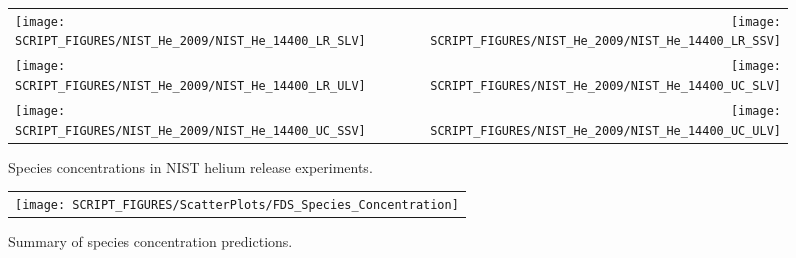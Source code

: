 \begin{figure}[p]
\begin{tabular*}{\textwidth}{l@{\extracolsep{\fill}}r}
\texttt{[image: SCRIPT\_FIGURES/NIST\_He\_2009/NIST\_He\_14400\_LR\_SLV]} &
\texttt{[image: SCRIPT\_FIGURES/NIST\_He\_2009/NIST\_He\_14400\_LR\_SSV]} \\
\texttt{[image: SCRIPT\_FIGURES/NIST\_He\_2009/NIST\_He\_14400\_LR\_ULV]} &
\texttt{[image: SCRIPT\_FIGURES/NIST\_He\_2009/NIST\_He\_14400\_UC\_SLV]} \\
\texttt{[image: SCRIPT\_FIGURES/NIST\_He\_2009/NIST\_He\_14400\_UC\_SSV]} &
\texttt{[image: SCRIPT\_FIGURES/NIST\_He\_2009/NIST\_He\_14400\_UC\_ULV]}
\end{tabular*}
\caption[Species concentrations in NIST helium release experiments]{Species concentrations in NIST helium release experiments.}
\label{NIST_Hydrogen_Species_3}
\end{figure}

\begin{figure}[p]
\begin{center}
\begin{tabular}{c}
\texttt{[image: SCRIPT\_FIGURES/ScatterPlots/FDS\_Species\_Concentration]}
\end{tabular}
\end{center}
\caption[Summary of species concentration predictions]{Summary of species concentration predictions.}
\label{Summary_Species_Concentration}
\end{figure}


